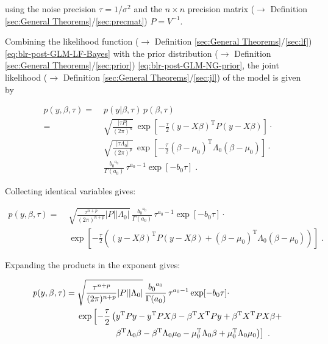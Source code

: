 \documentclass[a4paper,12pt,twoside]{book}
\begin{document}
using the noise precision $\tau = 1/\sigma^2$ and the $n \times n$ precision matrix ($\rightarrow$ Definition \ref{sec:General Theorems}/\ref{sec:precmat}) $P = V^{-1}$.

\vspace{1em}
Combining the likelihood function ($\rightarrow$ Definition \ref{sec:General Theorems}/\ref{sec:lf}) \eqref{eq:blr-post-GLM-LF-Bayes} with the prior distribution ($\rightarrow$ Definition \ref{sec:General Theorems}/\ref{sec:prior}) \eqref{eq:blr-post-GLM-NG-prior}, the joint likelihood ($\rightarrow$ Definition \ref{sec:General Theorems}/\ref{sec:jl}) of the model is given by

\begin{equation} \label{eq:blr-post-GLM-NG-JL-s1}
\begin{split}
p(y,\beta,\tau) = \; & p(y|\beta,\tau) \, p(\beta,\tau) \\
= \; & \sqrt{\frac{|\tau P|}{(2 \pi)^n}} \, \exp\left[ -\frac{\tau}{2} (y-X\beta)^\mathrm{T} P (y-X\beta) \right] \cdot \\
& \sqrt{\frac{|\tau \Lambda_0|}{(2 \pi)^p}} \, \exp\left[ -\frac{\tau}{2} (\beta-\mu_0)^\mathrm{T} \Lambda_0 (\beta-\mu_0) \right] \cdot \\
& \frac{ {b_0}^{a_0}}{\Gamma(a_0)} \, \tau^{a_0-1} \exp[-b_0 \tau] \; .
\end{split}
\end{equation}

Collecting identical variables gives:

\begin{equation} \label{eq:blr-post-GLM-NG-JL-s2}
\begin{split}
p(y,\beta,\tau) = \; & \sqrt{\frac{\tau^{n+p}}{(2 \pi)^{n+p}} |P| |\Lambda_0|} \, \frac{ {b_0}^{a_0}}{\Gamma(a_0)} \, \tau^{a_0-1} \exp[-b_0 \tau] \cdot \\
& \exp\left[ -\frac{\tau}{2} \left( (y-X\beta)^\mathrm{T} P (y-X\beta) + (\beta-\mu_0)^\mathrm{T} \Lambda_0 (\beta-\mu_0) \right) \right] \; .
\end{split}
\end{equation}

Expanding the products in the exponent gives:

\begin{equation} \label{eq:blr-post-GLM-NG-JL-s3}
\begin{split}
p(y,\beta,\tau) = \; & \sqrt{\frac{\tau^{n+p}}{(2 \pi)^{n+p}} |P| |\Lambda_0|} \, \frac{ {b_0}^{a_0}}{\Gamma(a_0)} \, \tau^{a_0-1} \exp[-b_0 \tau] \cdot \\
& \exp\left[ -\frac{\tau}{2} \left( y^\mathrm{T} P y - y^\mathrm{T} P X \beta - \beta^\mathrm{T} X^\mathrm{T} P y + \beta^\mathrm{T} X^\mathrm{T} P X \beta + \right. \right. \\
& \hphantom{\exp \left[ -\frac{\tau}{2} \right.} \; \left. \left. \beta^\mathrm{T} \Lambda_0 \beta - \beta^\mathrm{T} \Lambda_0 \mu_0 - \mu_0^\mathrm{T} \Lambda_0 \beta + \mu_0^\mathrm{T} \Lambda_0 \mu_0 \right) \right] \; .
\end{split}
\end{equation}
\end{document}
